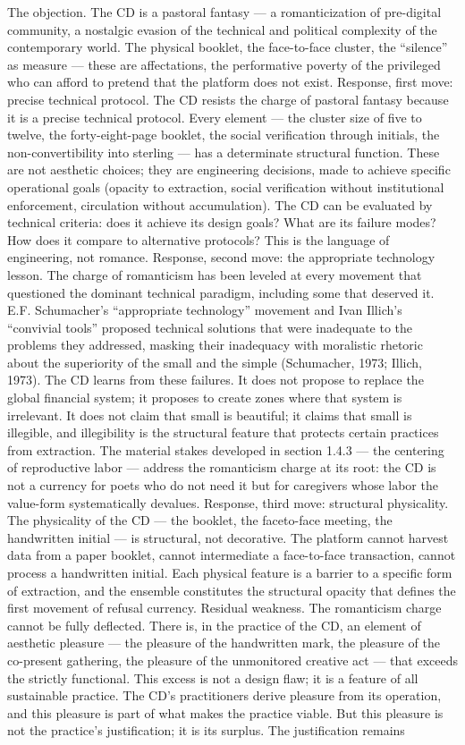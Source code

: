 The objection. The CD is a pastoral fantasy — a romanticization of pre-digital community, a nostalgic evasion of the technical and political complexity of the contemporary world. The physical booklet, the face-to-face cluster, the “silence” as measure — these are affectations, the performative poverty of the privileged who can afford to pretend that the platform does not exist. Response, first move: precise technical protocol. The CD resists the charge of pastoral fantasy because it is a precise technical protocol. Every element — the cluster size of five to twelve, the forty-eight-page booklet, the social verification through initials, the non-convertibility into sterling — has a determinate structural function. These are not aesthetic choices; they are engineering decisions, made to achieve specific operational goals (opacity to extraction, social verification without institutional enforcement, circulation without accumulation). The CD can be evaluated by technical criteria: does it achieve its design goals? What are its failure modes? How does it compare to alternative protocols? This is the language of engineering, not romance. Response, second move: the appropriate technology lesson. The charge of romanticism has been leveled at every movement that questioned the dominant technical paradigm, including some that deserved it. E.F. Schumacher’s “appropriate technology” movement and Ivan Illich’s “convivial tools” proposed technical solutions that were inadequate to the problems they addressed, masking their inadequacy with moralistic rhetoric about the superiority of the small and the simple (Schumacher, 1973; Illich, 1973). The CD learns from these failures. It does not propose to replace the global financial system; it proposes to create zones where that system is irrelevant. It does not claim that small is beautiful; it claims that small is illegible, and illegibility is the structural feature that protects certain practices from extraction. The material stakes developed in section 1.4.3 — the centering of reproductive labor — address the romanticism charge at its root: the CD is not a currency for poets who do not need it but for caregivers whose labor the value-form systematically devalues. Response, third move: structural physicality. The physicality of the CD — the booklet, the faceto-face meeting, the handwritten initial — is structural, not decorative. The platform cannot harvest data from a paper booklet, cannot intermediate a face-to-face transaction, cannot process a handwritten initial. Each physical feature is a barrier to a specific form of extraction, and the ensemble constitutes the structural opacity that defines the first movement of refusal currency. Residual weakness. The romanticism charge cannot be fully deflected. There is, in the practice of the CD, an element of aesthetic pleasure — the pleasure of the handwritten mark, the pleasure of the co-present gathering, the pleasure of the unmonitored creative act — that exceeds the strictly functional. This excess is not a design flaw; it is a feature of all sustainable practice. The CD’s practitioners derive pleasure from its operation, and this pleasure is part of what makes the practice viable. But this pleasure is not the practice’s justification; it is its surplus. The justification remains 